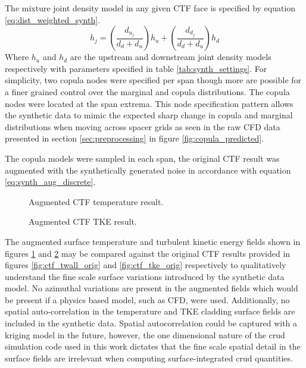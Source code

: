 The mixture joint density model in any given CTF face is specified by equation \ref{eq:dist_weighted_synth}.
\begin{equation}
    h_j = \left( \frac{d_{u_j}}{d_{d} + d_{u}} \right) h_u +
    \left( \frac{d_{d_j}}{d_{d} + d_{u}} \right) h_d
    \label{eq:dist_weighted_synth}
\end{equation}
Where $h_u$ and $h_d$ are the upstream and downstream joint density models respectively with parameters specified in table \ref{tab:synth_settings}.
For simplicity, two copula nodes were specified per span though more are possible for a finer grained control over the marginal and copula distributions.    The copula nodes were located at the span extrema. This node specification pattern allows the synthetic data to mimic the expected sharp change in copula and marginal distributions when moving across spacer grids as seen in the raw CFD data presented in section \ref{sec:preprocessing} in figure \ref{fig:copula_predicted}.

The copula models were sampled in each span, the original CTF result was augmented with the synthetically generated noise in accordance with equation \ref{eq:synth_aug_discrete}.

\begin{figure}[H]%
    \centering
    \qquad
    \caption[Augmented CFD result.]{Augmented CTF temperature result.}%
    \label{fig:ctf_twall_aug}%
\end{figure}

\begin{figure}[H]%
    \centering
    \qquad
    \caption[Augmented CFD TKE result.]{Augmented CTF TKE result.}%
    \label{fig:ctf_tke_aug}%
\end{figure}

The augmented surface temperature and turbulent kinetic energy fields shown in figures \ref{fig:ctf_twall_aug} and \ref{fig:ctf_tke_aug} may be compared against the original CTF results provided in figures \ref{fig:ctf_twall_orig} and \ref{fig:ctf_tke_orig} respectively to qualitatively understand the fine scale surface variations introduced by the synthetic data model.  No azimuthal variations are present in the augmented fields which would be present if a physics based model, such as CFD, were used.  Additionally, no spatial auto-correlation in the temperature and TKE cladding surface fields are included in the synthetic data.  Spatial autocorrelation could be captured with a kriging model in the future, however, the one dimensional nature of the crud simulation code used in this work dictates that the fine scale spatial detail in the surface fields are irrelevant when computing surface-integrated crud quantities.


